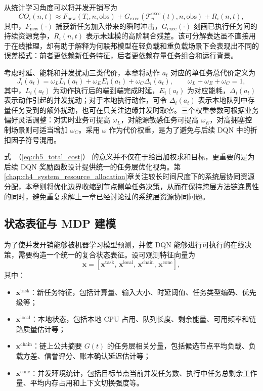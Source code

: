 从统计学习角度可以将并发开销写为
\begin{equation}
    CO_i(n,t) \approx F_{\mathrm{new}}(T_i,n,\mathrm{obs})
    + G_{\mathrm{exec}}(\mathcal{T}_{n}^{\mathrm{exec}}(t),n,\mathrm{obs})
    + R_i(n,t),
    \label{eq:ch5_co_decomp}
\end{equation}
其中，$F_{\mathrm{new}}(\cdot)$ 捕获新任务加入带来的瞬时冲击，$G_{\mathrm{exec}}(\cdot)$ 刻画已执行任务间的持续资源竞争，$R_i(n,t)$ 表示未建模的高阶耦合残差。该可分解表达虽不直接用于在线推理，却有助于解释为何联邦模型在轻负载和重负载场景下会表现出不同的误差模式：前者更依赖新任务特征，后者更依赖存量任务组合和运行背景。

考虑时延、能耗和并发扰动三类代价，本章将动作 $a_t$ 对应的单任务总代价定义为
\begin{equation}
    J_i(a_t) = \omega_L L_i(a_t) + \omega_E E_i(a_t) + \omega_C \Delta_i(a_t),
    \qquad
    \omega_L+\omega_E+\omega_C=1,
    \label{eq:ch5_total_cost}
\end{equation}
其中，$L_i(a_t)$ 为动作执行后的端到端完成时延，$E_i(a_t)$ 为对应能耗，$\Delta_i(a_t)$ 表示动作引起的并发扰动；对于本地执行动作，可令 $\Delta_i(a_t)$ 表示本地队列中存量任务受到的额外扰动，也可在只关注边缘并发时取零。三个权重参数可根据业务偏好灵活调整：对实时业务可提高 $\omega_L$，对能源敏感任务可提高 $\omega_E$，对高拥塞控制场景则可适当增加 $\omega_C$。采用 $\omega$ 作为代价权重，是为了避免与后续 DQN 中的折扣因子符号混用。

式~（\ref{eq:ch5_total_cost}） 的意义并不仅在于给出加权求和目标，更重要的是为后续 DQN 奖励函数设计提供统一的任务层优化视角。第\ref{chap:ch4_system_resource_allocation}章关注较长时间尺度下的系统层协同资源分配，本章则将优化边界收缩到{节点侧单任务决策}，从而在保持跨层方法链连贯性的同时，避免重复求解上一章已经讨论过的系统层资源协同问题。

\subsection{状态表征与 MDP 建模}

为了使并发开销能够被机器学习模型预测，并使 DQN 能够进行可执行的在线决策，需要构造一个统一的复合状态表征。设可观测特征向量为
\begin{equation}
    \bm{x} = \left[ \bm{x}^{\mathrm{task}},\,
        \bm{x}^{\mathrm{local}},\,
        \bm{x}^{\mathrm{chain}},\,
        \bm{x}^{\mathrm{conc}}
        \right],
    \label{eq:ch5_feature_vector}
\end{equation}
其中：
\begin{itemize}[leftmargin=2.5em]
    \item $\bm{x}^{\mathrm{task}}$：新任务特征，包括计算量、输入大小、时延阈值、任务类型编码、优先级等；
    \item $\bm{x}^{\mathrm{local}}$：本地状态，包括本地 CPU 占用、队列长度、剩余能量、可用频率和链路质量估计等；
    \item $\bm{x}^{\mathrm{chain}}$：链上公共摘要 $G(t)$ 的任务层相关分量，包括候选节点平均负载、负载方差、信誉评分、账本确认延迟估计等；
    \item $\bm{x}^{\mathrm{conc}}$：并发环境统计，包括目标节点当前并发任务数、执行中任务总剩余工作量、平均内存占用和上下文切换强度等。
\end{itemize}

